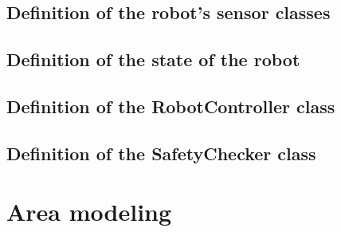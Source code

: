 \documentclass[a4paper]{article}
\begin{document}
\pagebreak
\subsection{Definition of the robot's sensor classes}


\pagebreak


\pagebreak
\subsection{Definition of the state of the robot}


\pagebreak
\subsection{Definition of the RobotController class}


\pagebreak
\subsection{Definition of the SafetyChecker class}



% 


\pagebreak
\appendix
\section{Area modeling}
\end{document}
